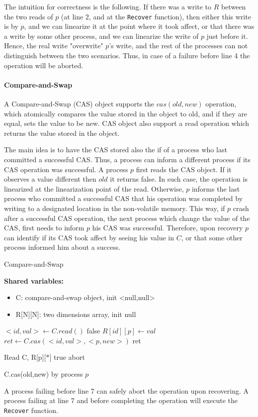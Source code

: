 The intuition for correctness is the following. If there was a write to $R$ between the two reads of $p$ (at line 2, and at the \texttt{Recover} function), then either this write is by $p$, and we can linearize it at the point where it took affect, or that there was a write by some other process, and we can linearize the write of $p$ just before it. Hence, the real write "overwrite" $p$'s write, and the rest of the processes can not distinguish between the two scenarios. Thus, in case of a failure before line 4 the operation will be aborted.


\paragraph*{Compare-and-Swap}

A Compare-and-Swap (CAS) object supports the $cas(old,new)$ operation, which atomically compares the value stored in the object to old, and if they are equal, sets the value to be new. CAS object also support a read operation which returns the value stored in the object.

The main idea is to have the CAS stored also the if of a process who last committed a successful CAS. Thus, a process can inform a different process if its CAS operation was successful.
A process $p$ first reads the CAS object. If it observes a value different then $old$ it returns false. In such case, the operation is linearized at the linearization point of the read. Otherwise, $p$ informs the last process who committed a successful CAS that his operation was completed by writing to a designated location in the non-volatile memory. This way, if $p$ crash after a successful CAS operation, the next process which change the value of the CAS, first needs to inform $p$ his CAS was successful. Therefore, upon recovery $p$ can identify if its CAS took affect by seeing his value in $C$, or that some other process informed him about a success.

\begin{algorithm}
	\caption{Compare-and-Swap}\label{recoverable CAS}
	
	\hspace*{\algorithmicindent} \textbf{Shared variables:}
	\begin{itemize}
		\item C: compare-and-swap object, init <null,null>
		\item R[N][N]: two dimensions array, init null
	\end{itemize}
 
	\begin{algorithmic}[1]
		\State $<id,val> \gets C.read()$
		\State \Return false
		\EndIf
  		\State $R[id][p] \gets val$
		\EndIf
		\State $ret \gets C.cas(<id,val>, <p,new>)$
		\State \Return ret
		\EndProcedure
		
		\State Read C, R[p][$*$]
		\State \Return true
		\Else {}
		\State \Return abort
		\EndIf
		\EndProcedure
	\end{algorithmic}
	\caption{C.cas(old,new) by process $p$}
\end{algorithm}


A process failing before line 7 can safely abort the operation upon recovering. A process failing at line 7 and before completing the operation will execute the \texttt{Recover} function.